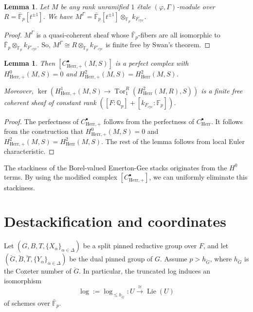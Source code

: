 \documentclass[11pt]{amsart}
\newtheorem{lem}[thm]{Lemma}
\theoremstyle{definition}
\newcommand{\EDIT}[1]{{\color{purple} #1}}
\newcommand{\Q}{\mathbb{Q}}
\newcommand{\F}{\mathbb{F}}
\newcommand{\bFp}{\bar{\mathbb{F}}_p}
\newcommand{\bG}{\breve{G}}
\newcommand{\bB}{\breve{B}}
\newcommand{\bT}{\breve{T}}
\newcommand{\cyc}{{\operatorname{cyc}}}
\newcommand{\dkF}{[k_{F_{\cyc}}:\F_p]}
\newcommand{\dF}{[F:\Q_p]}
\DeclareMathOperator{\Lie}{Lie}
\DeclareMathOperator{\Tor}{Tor}
\newcommand{\Herr}{\mathrm{Herr}}
\begin{document}
\begin{lem}
\rm
Let $M$ be any rank \EDIT{unramified}
$1$ \'etale $(\varphi, \Gamma)$-module
over $R=\bFp[t^{\pm1}]$.
We have
$M^{\Gamma}=\bFp[t^{\pm1}]\otimes_{\F_p}k_{F_{\cyc}}$.
\end{lem}

\begin{proof}
$M^{\Gamma}$ is a quasi-coherent sheaf
whose $\bFp$-fibers are all isomorphic
to $\bFp\otimes_{\F_p}k_{F'_{\cyc}}$.
So, $M^{\Gamma}\cong R\otimes_{\F_p}k_{F'_{\cyc}}$ is finite free by Swan's theorem.
\end{proof}

\begin{lem}
\label{lem:Herr+}
\rm
Then $[C^\bullet_{\Herr,+}(M,S)]$ is a perfect complex
with $H^0_{\Herr,+}(M,S)=0$ and $H^2_{\Herr,+}(M,S)=H^2_\Herr(M,S)$.

Moreover, $\ker(H^1_{\Herr,+}(M,S)\to \Tor^R_1(H^2_\Herr(M,R),S))$
is a finite free coherent sheaf of constant rank 
$(\dF+\dkF)$.
\end{lem}

\begin{proof}
The perfectness of $C_{\Herr,+}^\bullet$
follows from 
the perfectness of $C_{\Herr}^\bullet$.
It follows from the construction that
$H^0_{\Herr,+}(M,S)=0$
and $H^2_{\Herr,+}(M,S)=H^2_\Herr(M,S)$.
The rest of the lemma follows from local Euler characteristic.
\end{proof}



The stackiness of the Borel-valued Emerton-Gee stacks originates from the $H^0$ terms. By using the modified complex $[C_{\Herr,+}^\bullet]$, we can uniformly eliminate this stackiness.



\section{Destackification and coordinates}

\label{sec:destack}
Let $(G,B,T,\{X_{\alpha}\}_{\alpha\in \Delta})$ be a split
pinned reductive group over $F$,
and let $(\bG, \bB, \bT, \{Y_{\alpha}\}_{\alpha\in \Delta})$ be the dual pinned group of $G$.
Assume $p> h_{\bG}$, where
$h_{\bG}$ is the Coxeter number of $\bG$.
In particular,
the truncated log induces an isomorphism
\[
\log:=\log_{\le h_{\bG}}: U\xrightarrow{\cong} \Lie(U)
\]
of schemes over $\bFp$.
\end{document}
